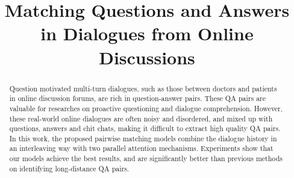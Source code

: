 \documentclass{article}
\title{Matching Questions and Answers in Dialogues from Online Discussions}
\author{
}
\begin{document}
\maketitle

\begin{abstract}
Question motivated multi-turn dialogues, such as those between doctors and patients in online discussion forums, are rich in question-answer pairs. These QA pairs are valuable for researches on proactive questioning and dialogue comprehension. However, these real-world online dialogues are often noisy and disordered, and mixed up with questions, answers and chit chats, making it difficult to extract high quality QA pairs. In this work, the proposed pairwise matching models combine the dialogue history in an interleaving way with two parallel attention mechanisms. Experiments show that our models achieve the best results, and are significantly better than previous methods on identifying long-distance QA pairs.
\end{abstract}


















\end{document}
